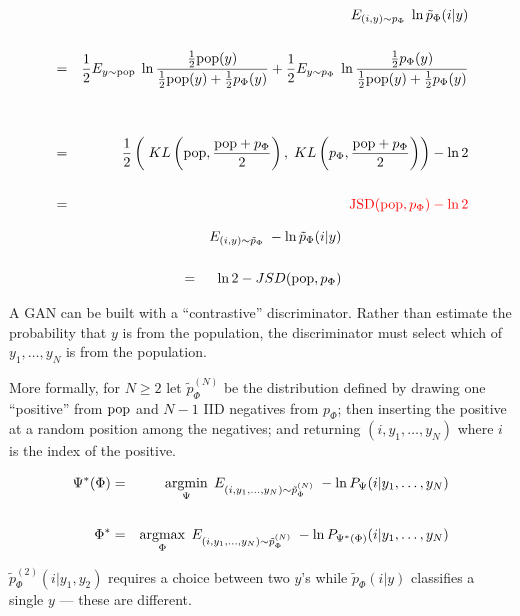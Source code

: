 {\begin{eqnarray*}
& & E_{(i,y) \sim  p_\Phi}\;\ln \tilde{p}_\Phi(i|y) \\
\\
& = & \frac{1}{2} E_{y \sim \mathrm{pop}}\; \ln \frac{\frac{1}{2}\mathrm{pop}(y)}{\frac{1}{2}\mathrm{pop}(y) + \frac{1}{2} p_\Phi(y)} + \frac{1}{2} E_{y \sim p_\Phi}\;\ln \frac{\frac{1}{2}p_\Phi(y)}{\frac{1}{2}\mathrm{pop}(y) + \frac{1}{2}p_\Phi(y)} \\
\\
\\
& = & \frac{1}{2} \left(\;KL\left(\mathrm{pop},\frac{\mathrm{pop}+p_\Phi}{2}\right),\;KL\left(p_\Phi,\frac{\mathrm{pop}+p_\Phi}{2}\right)\right) - \ln 2 \\
\\
& = & {\color{red} \mathrm{JSD}(\mathrm{pop},p_\Phi) - \ln 2}
\end{eqnarray*}


\begin{eqnarray*}
& &  E_{(i,y) \sim \tilde{p}_\Phi}\; - \ln \tilde{p}_\Phi(i|y) \\
\\
& = & \ln 2 - JSD(\mathrm{pop},p_\Phi)
\end{eqnarray*}



A GAN can be built with a ``contrastive'' discriminator.  Rather than estimate the probability that $y$ is from the population, the discriminator must select which
of $y_1,\ldots,y_N$ is from the population.

\vfill
More formally, for $N \geq 2$ let {\color{red} $\tilde{p}_\Phi^{(N)}$} be the distribution defined by drawing one ``positive'' from $\mathrm{pop}$ and $N-1$ IID negatives from $p_\Phi$;
then inserting the positive at a random position among the negatives; and returning $(i,y_1,\ldots,y_N)$ where
$i$ is the index of the positive.


\begin{eqnarray*}
\Psi^*(\Phi) & = & \operatorname*{argmin}_\Psi\; E_{(i,y_1,\ldots,y_{N})\sim \tilde{p}_\Phi^{(N)}} \;- \ln P_\Psi(i|y_1,\ldots,y_{N}) \\
\\
\Phi^* & = & \operatorname*{argmax}_\Phi\; E_{(i,y_1,\ldots,y_{N})\sim \tilde{p}_\Phi^{(N)}} \;- \ln P_{\Psi^*(\Phi)}(i|y_1,\ldots,y_{N})
\end{eqnarray*}

\vfill
{\color{red} $\tilde{p}_\Phi^{(2)}(i|y_1,y_2)$} requires a choice between two $y$'s while {\color{red} $\tilde{p}_\Phi(i|y)$} classifies a single $y$ --- these are different.

}

